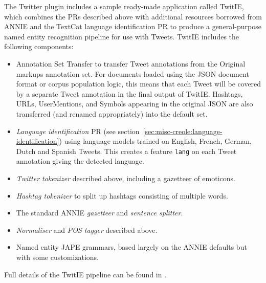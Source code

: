 
The Twitter plugin includes a sample ready-made application called TwitIE,
which combines the PRs described above with additional resources borrowed from
ANNIE and the TextCat language identification PR to produce a general-purpose
named entity recognition pipeline for use with Tweets.  TwitIE includes the
following components:

\begin{itemize}
\item Annotation Set Transfer to transfer Tweet annotations from the Original
  markups annotation set.  For documents loaded using the JSON document format
  or corpus population logic, this means that each Tweet will be covered by a
  separate Tweet annotation in the final output of TwitIE. Hashtags, URLs,
  UserMentions, and Symbols appearing in the original JSON are also transferred
  (and renamed appropriately) into the default set.
\item \emph{Language identification} PR (see
  section~\ref{sec:misc-creole:language-identification}) using language models
  trained on English, French, German, Dutch and Spanish Tweets.  This creates a
  feature \verb!lang! on each Tweet annotation giving the detected language.
\item \emph{Twitter tokenizer} described above, including a gazetteer of
  emoticons.
\item \emph{Hashtag tokenizer} to split up hashtags consisting of multiple
  words.
\item The standard ANNIE \emph{gazetteer} and \emph{sentence splitter}.
\item \emph{Normaliser} and \emph{POS tagger} described above.
\item Named entity JAPE grammars, based largely on the ANNIE defaults but with
  some customizations.
\end{itemize}

Full details of the TwitIE pipeline can be found in \cite{bontcheva2013twitie}.

